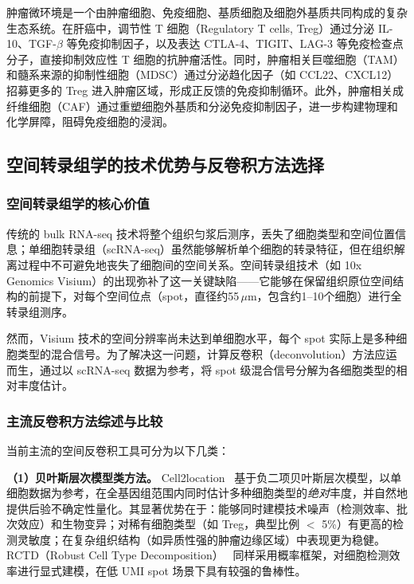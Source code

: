 \documentclass[12pt, a4paper]{ctexart}
\begin{document}
肿瘤微环境是一个由肿瘤细胞、免疫细胞、基质细胞及细胞外基质共同构成的复杂生态系统。在肝癌中，调节性 T 细胞（Regulatory T cells, Treg）通过分泌 IL-10、TGF-$\beta$ 等免疫抑制因子，以及表达 CTLA-4、TIGIT、LAG-3 等免疫检查点分子，直接抑制效应性 T 细胞的抗肿瘤活性。同时，肿瘤相关巨噬细胞（TAM）和髓系来源的抑制性细胞（MDSC）通过分泌趋化因子（如 CCL22、CXCL12）招募更多的 Treg 进入肿瘤区域，形成正反馈的免疫抑制循环。此外，肿瘤相关成纤维细胞（CAF）通过重塑细胞外基质和分泌免疫抑制因子，进一步构建物理和化学屏障，阻碍免疫细胞的浸润。

\subsection{空间转录组学的技术优势与反卷积方法选择}
\label{sec:method_choice}

\subsubsection{空间转录组学的核心价值}

传统的 bulk RNA-seq 技术将整个组织匀浆后测序，丢失了细胞类型和空间位置信息；单细胞转录组（scRNA-seq）虽然能够解析单个细胞的转录特征，但在组织解离过程中不可避免地丧失了细胞间的空间关系。空间转录组技术（如 10x Genomics Visium）的出现弥补了这一关键缺陷——它能够在保留组织原位空间结构的前提下，对每个空间位点（spot，直径约55\,$\mu$m，包含约1--10个细胞）进行全转录组测序。

然而，Visium 技术的空间分辨率尚未达到单细胞水平，每个 spot 实际上是多种细胞类型的混合信号。为了解决这一问题，计算反卷积（deconvolution）方法应运而生，通过以 scRNA-seq 数据为参考，将 spot 级混合信号分解为各细胞类型的相对丰度估计。

\subsubsection{主流反卷积方法综述与比较}

当前主流的空间反卷积工具可分为以下几类：

\textbf{（1）贝叶斯层次模型类方法。}
Cell2location~\cite{kleshchevnikov2022cell2location} 基于负二项贝叶斯层次模型，以单细胞数据为参考，在全基因组范围内同时估计多种细胞类型的\emph{绝对}丰度，并自然地提供后验不确定性量化。其显著优势在于：能够同时建模技术噪声（检测效率、批次效应）和生物变异；对稀有细胞类型（如 Treg，典型比例 $<$ 5\%）有更高的检测灵敏度；在复杂组织结构（如异质性强的肿瘤边缘区域）中表现更为稳健。
RCTD（Robust Cell Type Decomposition）~\cite{cable2021robust} 同样采用概率框架，对细胞检测效率进行显式建模，在低 UMI spot 场景下具有较强的鲁棒性。
\end{document}
